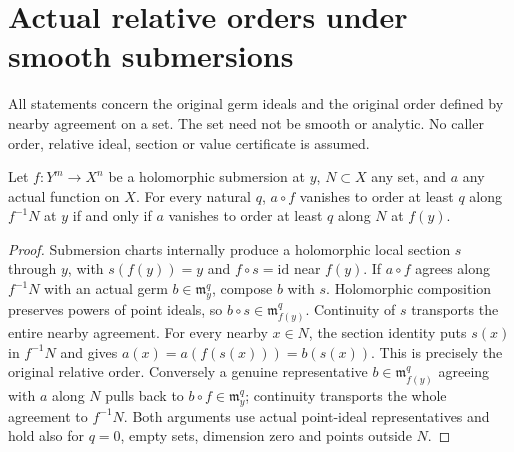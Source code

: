 \section{Actual relative orders under smooth submersions}

All statements concern the original germ ideals and the original order
defined by nearby agreement on a set. The set need not be smooth or analytic.
No caller order, relative ideal, section or value certificate is assumed.

\begin{lemma}
\label{hir:smooth-relative-function-order}
\leanok
Let $f:Y^m\to X^n$ be a holomorphic submersion at $y$, $N\subset X$
any set, and $a$ any actual function on $X$. For every natural $q$,
$a\circ f$ vanishes to order at least $q$ along $f^{-1}N$ at $y$
if and only if $a$ vanishes to order at least $q$ along $N$ at $f(y)$.
\end{lemma}
\begin{proof}
Submersion charts internally produce a holomorphic local section $s$
through $y$, with $s(f(y))=y$ and $f\circ s=\mathrm{id}$ near $f(y)$.
If $a\circ f$ agrees along $f^{-1}N$ with an actual germ
$b\in\mathfrak m_y^q$, compose $b$ with $s$. Holomorphic composition
preserves powers of point ideals, so $b\circ s\in\mathfrak m_{f(y)}^q$.
Continuity of $s$ transports the entire nearby agreement. For every nearby
$x\in N$, the section identity puts $s(x)$ in $f^{-1}N$ and gives
$a(x)=a(f(s(x)))=b(s(x))$. This is precisely the original relative order.
Conversely a genuine representative $b\in\mathfrak m_{f(y)}^q$ agreeing
with $a$ along $N$ pulls back to $b\circ f\in\mathfrak m_y^q$;
continuity transports the whole agreement to $f^{-1}N$. Both arguments
use actual point-ideal representatives and hold also for $q=0$, empty
sets, dimension zero and points outside $N$.
\end{proof}

